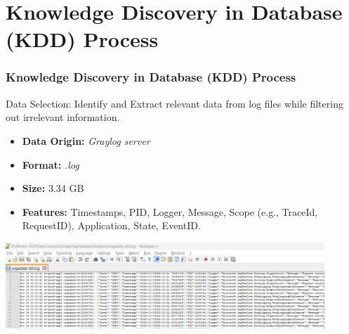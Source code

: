 \documentclass[10pt, a4paper]{beamer}
\begin{document}
	
	
\section{Knowledge Discovery in Database (KDD) Process}
\begin{frame}
	\frametitle{Knowledge Discovery in Database (KDD) Process}
	\begin{block}{Data Selection:}
		Identify and Extract relevant data from log files while filtering out irrelevant information.
		\begin{itemize}
			\item \textbf{Data Origin:} \textit{Graylog server} 
			\item \textbf{Format:} \textit{.log} 
			\item \textbf{Size:} 3.34 GB
			\item \textbf{Features:} Timestamps, PID, Logger, Message, Scope (e.g., TraceId, RequestID), Application, State, EventID.
		\end{itemize}
	\end{block}
	
	\centering
	\includegraphics[width=0.9\textwidth]{images/Database.jpeg} %
	
\centering
	
\end{frame}
\end{document}
